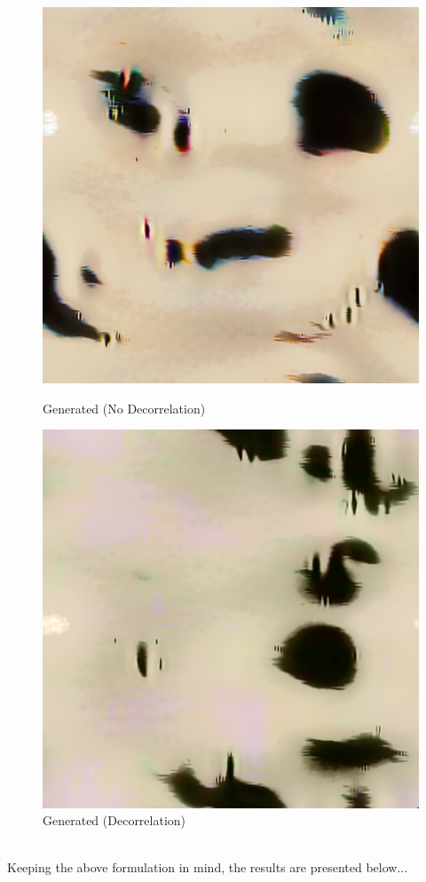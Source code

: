 \documentclass{article}
\begin{document}
    \begin{figure}[!htb]
    \begin{center}
      \includegraphics[scale=.35]{5/report/steerable/6_c_u2.png}
      \caption{Generated (No Decorrelation)}
    \end{center}
    \endminipage \hfill
    \begin{center}
      \includegraphics[scale=.35]{5/report/steerable/6_c2.png}
      \caption{Generated (Decorrelation)}
    \end{center}
    \endminipage
    \end{figure} 
\pagebreak\\
Keeping the above formulation in mind, the results are presented below...\\
\end{document}
